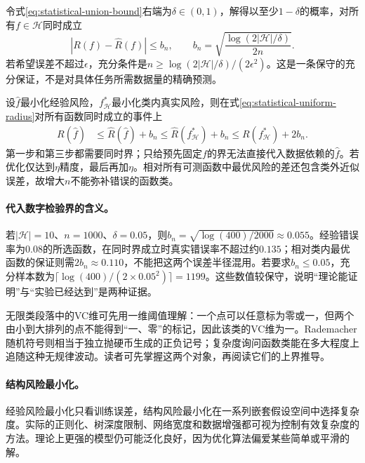 令式\eqref{eq:statistical-union-bound}右端为$\delta\in(0,1)$，解得以至少$1-\delta$的概率，对所有$f\in\mathcal H$同时成立
\begin{equation}
 |R(f)-\hat R(f)|\leq b_n,
 \qquad b_n=\sqrt{\frac{\log(2|\mathcal H|/\delta)}{2n}}.\label{eq:statistical-uniform-radius}
\end{equation}
若希望误差不超过$\epsilon$，充分条件是$n\geq\log(2|\mathcal H|/\delta)/(2\epsilon^2)$。这是一条保守的充分保证，不是对具体任务所需数据量的精确预测。

设$\hat f$最小化经验风险，$f_{\mathcal H}^*$最小化类内真实风险，则在式\eqref{eq:statistical-uniform-radius}对所有函数同时成立的事件上
\begin{align}
 R(\hat f)&\leq\hat R(\hat f)+b_n
 \leq\hat R(f_{\mathcal H}^*)+b_n
 \leq R(f_{\mathcal H}^*)+2b_n.
\end{align}
第一步和第三步都需要同时界；只给预先固定$f$的界无法直接代入数据依赖的$\hat f$。若优化仅达到$\eta$精度，最后再加$\eta$。相对所有可测函数中最优风险的差还包含类外近似误差，故增大$n$不能弥补错误的函数类。

\paragraph{代入数字检验界的含义。}
若$|\mathcal H|=10$、$n=1000$、$\delta=0.05$，则$b_n=\sqrt{\log(400)/2000}\approx0.055$。经验错误率为$0.08$的所选函数，在同时界成立时真实错误率不超过约$0.135$；相对类内最优函数的保证则需$2b_n\approx0.110$，不能把这两个误差半径混用。若要求$b_n\leq0.05$，充分样本数为$\lceil\log(400)/(2\times0.05^2)\rceil=1199$。这些数值较保守，说明“理论能证明”与“实验已经达到”是两种证据。

无限类段落中的VC维可先用一维阈值理解：一个点可以任意标为零或一，但两个由小到大排列的点不能得到“一、零”的标记，因此该类的VC维为一。Rademacher随机符号则相当于独立抛硬币生成的正负记号；复杂度询问函数类能在多大程度上追随这种无规律波动。读者可先掌握这两个对象，再阅读它们的上界推导。

\paragraph{结构风险最小化。}
经验风险最小化只看训练误差，结构风险最小化在一系列嵌套假设空间中选择复杂度。实际的正则化、树深度限制、网络宽度和数据增强都可视为控制有效复杂度的方法。理论上更强的模型仍可能泛化良好，因为优化算法偏爱某些简单或平滑的解。

